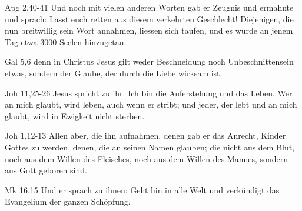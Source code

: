 \documentclass[aspectratio=43]{beamer}
\begin{document}
\begin{frame}  
    \vspace*{1cm}
        \begin{exampleblock}{Apg 2,40-41}
            \color{black}            
            Und noch mit vielen anderen Worten gab er Zeugnis und ermahnte und sprach: Lasst euch retten aus diesem verkehrten Geschlecht! Diejenigen, die nun breitwillig sein Wort annahmen, liessen sich taufen, und es wurde an jenem Tag etwa $3000$ Seelen hinzugetan.
        \end{exampleblock}  
    \vspace*{1cm}
\end{frame}
\begin{frame}  
    \vspace*{1cm}
        \begin{exampleblock}{Gal 5,6}
            \color{black}            
            denn in Christus Jesus gilt weder Beschneidung noch Unbeschnittensein etwas, sondern der Glaube, der durch die Liebe wirksam ist.
        \end{exampleblock}  
    \vspace*{1cm}
\end{frame}
\begin{frame}  
    \vspace*{1cm}
        \begin{exampleblock}{Joh 11,25-26}
            \color{black}            
            Jesus spricht zu ihr: Ich bin die Auferstehung und das Leben. Wer an mich glaubt, wird leben, auch wenn er stribt; und jeder, der lebt und an mich glaubt, wird in Ewigkeit nicht sterben.
        \end{exampleblock}  
        \begin{exampleblock}{Joh 1,12-13}
            \color{black}            
            Allen aber, die ihn aufnahmen, denen gab er das Anrecht, Kinder Gottes zu werden, denen, die an seinen Namen glauben; die nicht aus dem Blut, noch aus dem Willen des Fleisches, noch aus dem Willen des Mannes, sondern aus Gott geboren sind.
        \end{exampleblock}  
        \begin{exampleblock}{Mk 16,15}
            \color{blue}            
            Und er sprach zu ihnen: Geht hin in alle Welt und verkündigt das Evangelium der ganzen Schöpfung.
        \end{exampleblock}  
    \vspace*{1cm}
\end{frame}
\end{document}
